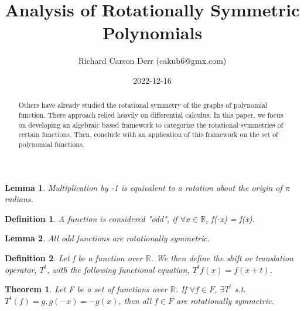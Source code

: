 \documentclass{article}
\title{Analysis of Rotationally Symmetric Polynomials}
\author{Richard Carson Derr (cakub6@gmx.com)}
\date{2022-12-16}
\newtheorem{definition}{Definition}
\newtheorem{lemma}{Lemma}
\newtheorem{theorem}{Theorem}
\begin{document}
\maketitle

\begin{abstract}
  Others have already studied the rotational symmetry
  of the graphs of polynomial function. There approach
  relied heavily on differential calculus. In this paper,
  we focus on developing an algebraic based framework
  to categorize the rotational symmetries of certain
  functions. Then, conclude with an application of this
  framework on the set of polynomial functions.
\end{abstract}

\begin{lemma}
  Multiplication by -1 is equivalent to a rotation about the origin of $\pi$ radians.
\end{lemma}

\begin{definition}
  A function is considered "odd", if $\forall x \in \mathbb{R}$, f(-x) = f(x).
\end{definition}

\begin{lemma}
  All odd functions are rotationally symmetric.
\end{lemma}

\begin{definition}
  Let f be a function over $\mathbb{R}$. We then define the shift or translation operator, $T^t$, with the following
  functional equation, $T^t f(x) = f(x+t)$.
\end{definition}

\begin{theorem}
  Let F be a set of functions over $\mathbb{R}$. If $\forall f\in F$, $\exists T^t$
  s.t. $T^t(f) = g, g(-x) = -g(x)$, then all $f \in F$ are rotationally symmetric.
\end{theorem}
\end{document}
